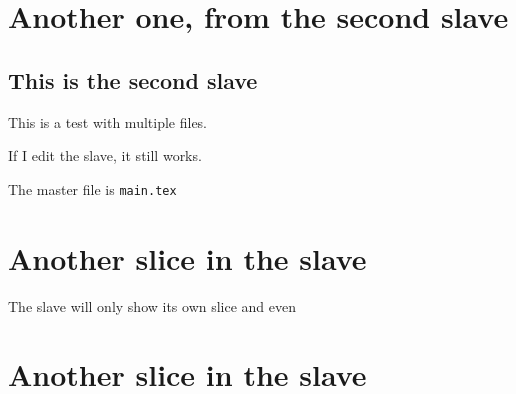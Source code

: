 \documentclass[main.tex]{subfiles}
\begin{document}
\section {Another one, from the second slave}


\subsection {This is the second slave}

This is a test with multiple files.


If I edit the slave, it still works.

The master file is \verb"main.tex"

\section {Another slice in the slave}

The slave will only show its own slice and even 

\section {Another slice in the slave}
\end{document}
